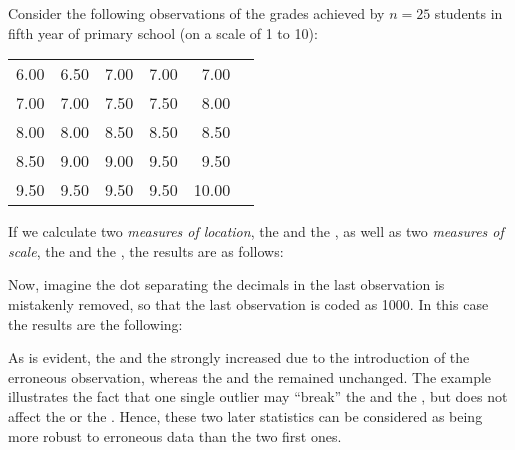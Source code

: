 \begin{stexample}
    Consider the following observations of the grades achieved by $n = 25$ students
    in fifth year of primary school (on a scale of 1 to 10):                        
    
    \begin{center}
    \begin{tabular}{rrrrrr}%
    6.00 & 6.50 & 7.00 & 7.00 & 7.00\\
    7.00 & 7.00 & 7.50 & 7.50 & 8.00\\
    8.00 & 8.00 & 8.50 & 8.50 & 8.50\\
    8.50 & 9.00 & 9.00 & 9.50 & 9.50\\
    9.50 & 9.50 & 9.50 & 9.50 & 10.00
    \end{tabular}
    \end{center}
    
    If we calculate two \emph{measures of location}, the  and the
    , as well as two \emph{measures of scale}, the
     and the , the results
    are as follows:
    
\begin{stlog}

\end{stlog}
    
    Now, imagine the dot separating the decimals in the last observation is
    mistakenly removed, so that the last observation is coded as 1000. In this 
    case the results are the following:
    
\begin{stlog}

\end{stlog}
    
    As is evident, the  and the  strongly
    increased due to the introduction of the erroneous observation, whereas
    the  and the  remained unchanged.
    The example illustrates the fact that one single outlier may “break” the
     and the , but does not affect the
     or the . Hence, these two later
    statistics can be considered as being more robust to erroneous data than
    the two first ones.


\end{stexample}
